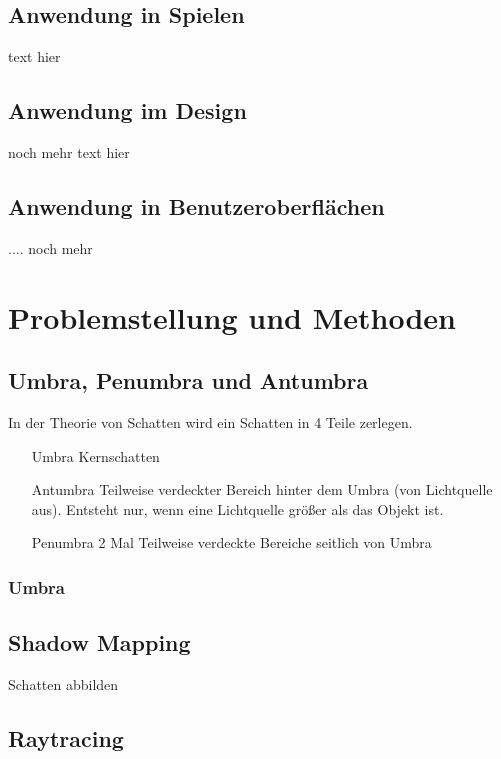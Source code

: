 \documentclass[10pt,twocolumn]{scrartcl}
\begin{document}
\subsection{Anwendung in Spielen}

text hier 

\subsection{Anwendung im Design}

noch mehr text hier

\subsection{Anwendung in Benutzeroberflächen}

.... noch mehr

\section{Problemstellung und Methoden}

\subsection{Umbra, Penumbra und Antumbra}

In der Theorie von Schatten wird ein Schatten in 4 Teile zerlegen.
\begin{enumerate}
 \item[Umbra] Kernschatten
 \item[Antumbra] Teilweise verdeckter Bereich hinter dem Umbra (von Lichtquelle aus). Entsteht nur, wenn eine Lichtquelle größer als das Objekt ist.
 \item[Penumbra] 2 Mal Teilweise verdeckte Bereiche seitlich von Umbra
\end{enumerate}

\subsubsection{Umbra}



\subsection{Shadow Mapping}

Schatten abbilden

\subsection{Raytracing}
\end{document}
